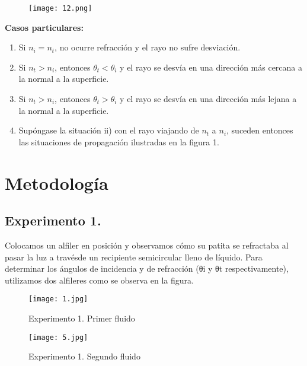 \documentclass[10pt,journal]{IEEEtran}
\begin{document}
\begin{figure}[!ht]
\begin {center}
\texttt{[image: 12.png]}
\caption{}
\end {center}
\end{figure}


\textbf{Casos particulares:}

\begin{enumerate}
\item Si $n_i = n_t$, no ocurre refracción y el rayo no sufre desviación.
\item Si $n_t > n_i$, entonces $\theta_t < \theta_i$ y el rayo se desvía en una dirección más cercana a la normal a la superficie.
\item Si $n_t > n_i$, entonces $\theta_t > \theta_i$ y el rayo se desvía en una dirección más lejana a la normal a la superficie.
\item Supóngase la situación ii) con el rayo viajando de $n_t$ a $n_i$, suceden entonces las situaciones de propagación ilustradas en la figura 1.
\end{enumerate}

\section{Metodología}


\subsection{Experimento 1.}
Colocamos un alfiler en posición y observamos cómo su patita se refractaba al pasar la luz a travésde un recipiente semicircular lleno de líquido. Para determinar los ángulos de incidencia y de refracción (θi y θt respectivamente), utilizamos dos alfileres como se observa en la figura.


\begin{figure}[!ht]
\begin {center}
\texttt{[image: 1.jpg]}
\caption{Experimento 1. Primer fluido}
\end {center}
\end{figure}

\begin{figure}[!ht]
\begin {center}
\texttt{[image: 5.jpg]}
\caption{Experimento 1. Segundo fluido}
\end {center}
\end{figure}
\end{document}
